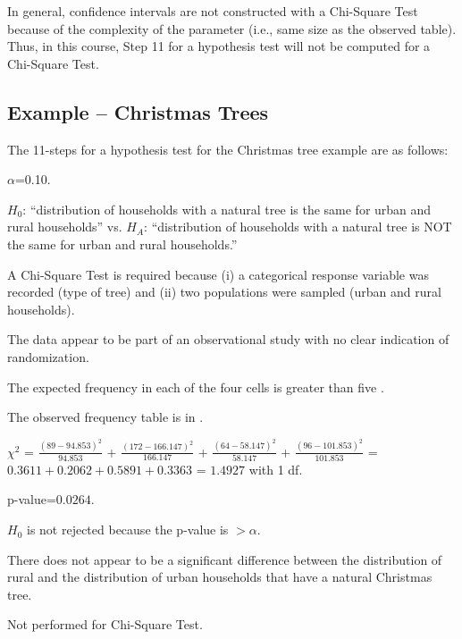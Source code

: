 \documentclass[10pt,openany]{book}\usepackage[]{graphicx}\usepackage[]{color}
\begin{document}
In general, confidence intervals are not constructed with a Chi-Square Test because of the complexity of the parameter (i.e., same size as the observed table).  Thus, in this course, Step 11 for a hypothesis test will not be computed for a Chi-Square Test.


\subsection{Example -- Christmas Trees}
\vspace{-12pt}
The 11-steps  for a hypothesis test for the Christmas tree example are as follows:
\vspace{-12pt}
  \begin{Enumerate}
    \item $\alpha$=0.10.
    \item $H_{0}$: ``distribution of households with a natural tree is the same for urban and rural households'' vs. $H_{A}$: ``distribution of households with a natural tree is NOT the same for urban and rural households.''
    \item A Chi-Square Test is required because (i) a categorical response variable was recorded (type of tree) and (ii) two populations were sampled (urban and rural households).
    \item The data appear to be part of an observational study with no clear indication of randomization.
    \item The expected frequency in each of the four cells is greater than five .
    \item The observed frequency table is in .
    \item $\chi^{2}$ = $\frac{(89-94.853)^{2}}{94.853}$ + $\frac{(172-166.147)^{2}}{166.147}$ + $\frac{(64-58.147)^{2}}{58.147}$ + $\frac{(96-101.853)^{2}}{101.853}$ = $0.3611+0.2062+0.5891+0.3363$ = $1.4927$ with 1 df.
    \item p-value=$0.0264$.
    \item $H_{0}$ is not rejected because the p-value is $>\alpha$.
    \item There does not appear to be a significant difference between the distribution of rural and the distribution of urban households that have a natural Christmas tree.
    \item Not performed for Chi-Square Test.
  \end{Enumerate}
\end{document}
